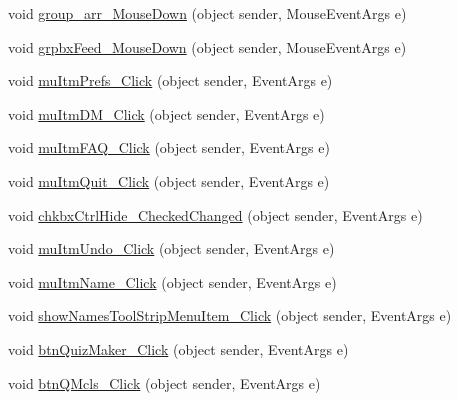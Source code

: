 \begin{DoxyCompactItemize}
\item 
void \hyperlink{class_sr_p___classroom_inq_1_1frm_classrrom_inq_a405c06879d3fcaef6c06fae80d320385}{group\-\_\-arr\-\_\-\-Mouse\-Down} (object sender, \-Mouse\-Event\-Args e)
\item 
void \hyperlink{class_sr_p___classroom_inq_1_1frm_classrrom_inq_ab291bba130fa54333ca1102880c3de9d}{grpbx\-Feed\-\_\-\-Mouse\-Down} (object sender, \-Mouse\-Event\-Args e)
\item 
void \hyperlink{class_sr_p___classroom_inq_1_1frm_classrrom_inq_a8d958123049b9831c795fc69846a4361}{mu\-Itm\-Prefs\-\_\-\-Click} (object sender, \-Event\-Args e)
\item 
void \hyperlink{class_sr_p___classroom_inq_1_1frm_classrrom_inq_a98c9af062defe91100614c630cd15e27}{mu\-Itm\-D\-M\-\_\-\-Click} (object sender, \-Event\-Args e)
\item 
void \hyperlink{class_sr_p___classroom_inq_1_1frm_classrrom_inq_ab4caa4c9e3362eca229979be7b7ae43a}{mu\-Itm\-F\-A\-Q\-\_\-\-Click} (object sender, \-Event\-Args e)
\item 
void \hyperlink{class_sr_p___classroom_inq_1_1frm_classrrom_inq_ac56c218b454f6a866f9248172c9500f4}{mu\-Itm\-Quit\-\_\-\-Click} (object sender, \-Event\-Args e)
\item 
void \hyperlink{class_sr_p___classroom_inq_1_1frm_classrrom_inq_ad624d08811b6ddb3384fddb6225d3ce3}{chkbx\-Ctrl\-Hide\-\_\-\-Checked\-Changed} (object sender, \-Event\-Args e)
\item 
void \hyperlink{class_sr_p___classroom_inq_1_1frm_classrrom_inq_ab510dcfe5ebb7cf0c943058612fcb54a}{mu\-Itm\-Undo\-\_\-\-Click} (object sender, \-Event\-Args e)
\item 
void \hyperlink{class_sr_p___classroom_inq_1_1frm_classrrom_inq_a2c699284eac06317a97faee9e5f305e5}{mu\-Itm\-Name\-\_\-\-Click} (object sender, \-Event\-Args e)
\item 
void \hyperlink{class_sr_p___classroom_inq_1_1frm_classrrom_inq_ad063fc4ba674b7e7e76eb12d6e5b3063}{show\-Names\-Tool\-Strip\-Menu\-Item\-\_\-\-Click} (object sender, \-Event\-Args e)
\item 
void \hyperlink{class_sr_p___classroom_inq_1_1frm_classrrom_inq_a8d440d379253fa5479a3b89ef54db5bf}{btn\-Quiz\-Maker\-\_\-\-Click} (object sender, \-Event\-Args e)
\item 
void \hyperlink{class_sr_p___classroom_inq_1_1frm_classrrom_inq_a6e7cdcc66d0d497b1692085fe08917cd}{btn\-Q\-Mcls\-\_\-\-Click} (object sender, \-Event\-Args e)
\item 

\end{DoxyCompactItemize}

